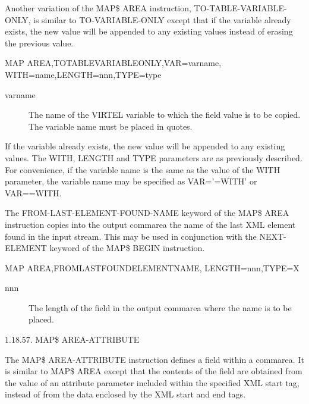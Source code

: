 \documentclass[letterpaper,10pt,english]{sphinxmanual}
\begin{document}
Another variation of the MAP\$ AREA instruction, TO-TABLE-VARIABLE-ONLY, is similar to TO-VARIABLE-ONLY except that if the variable already exists, the new value will be appended to any existing values instead of erasing the previous value.

\begin{sphinxVerbatim}[commandchars=\\\{\}]
MAP\PYGZdl{} AREA,TO\PYGZhy{}TABLE\PYGZhy{}VARIABLE\PYGZhy{}ONLY,VAR=\PYGZsq{}varname\PYGZsq{},
   WITH=\PYGZsq{}name\PYGZsq{},LENGTH=nnn,TYPE=type
\end{sphinxVerbatim}
\begin{description}
\item[{varname}] \leavevmode
The name of the VIRTEL variable to which the field value is to be copied. The variable name must be placed in quotes.

\end{description}

If the variable already exists, the new value will be appended to any existing values. The WITH, LENGTH and TYPE parameters are as previously described. For convenience, if the variable name is the same as the value of the WITH parameter, the variable name may be specified as VAR=’=WITH’ or VAR==WITH.

The FROM-LAST-ELEMENT-FOUND-NAME keyword of the MAP\$ AREA instruction copies into the output commarea the name of the last XML element found in the input stream. This may be used in conjunction with the NEXT-ELEMENT keyword of the MAP\$ BEGIN instruction.

\begin{sphinxVerbatim}[commandchars=\\\{\}]
MAP\PYGZdl{} AREA,FROM\PYGZhy{}LAST\PYGZhy{}FOUND\PYGZhy{}ELEMENT\PYGZhy{}NAME,
    LENGTH=nnn,TYPE=X
\end{sphinxVerbatim}
\begin{description}
\item[{nnn}] \leavevmode
The length of the field in the output commarea where the name is to be placed.

\end{description}

1.18.57. MAP\$ AREA-ATTRIBUTE

The MAP\$ AREA-ATTRIBUTE instruction defines a field within a commarea. It is similar to MAP\$ AREA except that the
contents of the field are obtained from the value of an attribute parameter included within the specified XML start tag,
instead of from the data enclosed by the XML start and end tags.
\end{document}
